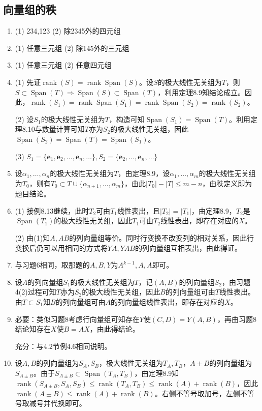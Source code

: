 \documentclass[a4paper,UTF8,fontset=windows]{ctexart}
\DeclareMathOperator{\rank}{rank}
\DeclareMathOperator{\Span}{Span}
\begin{document}
\subsection{向量组的秩}
\begin{enumerate}
\item
(1) 234,123 (2) 除2345外的四元组

\item
(1) 任意三元组 (2) 除145外的三元组

\item
(1) 任意三元组 (2) 任意四元组

\item
(1) 先证$\rank(S)=\rank\Span(S)$。设$S$的极大线性无关组为$T$，则$S\subset\Span(T)\Rightarrow\Span(S)\subset\Span(T)$，利用定理8.9知结论成立。因此，$\rank(S_1)=\rank\Span(S_1)=\rank\Span(S_2)=\rank(S_2)$。

(2) 设$S_1$的极大线性无关组为$T$，构造可知$\Span(S_1)=\Span(T)$。利用定理8.10与数量计算可知$T$亦为$S_2$的极大线性无关组，因此$\Span(S_2)=\Span(T)=\Span(S_1)$。

(3) $S_1=\{\mathbf{e}_1,\mathbf{e}_2,\dots,\mathbf{e}_n,\dots\},S_2=\{\mathbf{e}_2,\dots,\mathbf{e}_n,\dots\}$

\item
设$\alpha_1,\dots,\alpha_n$的极大线性无关组为$T$，由定理8.9，设$\alpha_1,\dots,\alpha_m$的极大线性无关组为$T_0$，则有$T_0\subset T\cup\{\alpha_{n+1},\dots,\alpha_m\}$，由此$|T_0|-|T|\le m-n$，由秩定义即为题目结论。

\item
(1) 接例8.13继续，此时$T_2$可由$T_1$线性表出，且$|T_2|=|T_1|$，由定理8.9，$T_2$是$\Span(T_1)$的极大线性无关组，因此$T_1$可由$T_2$线性表出，即存在对应的$X$。

(2) 由(1)知$A,AB$的列向量组等价。同时行变换不改变列的相对关系，因此行变换后仍可以用相同的方式将$YA,YAB$的列向量组互相表出，由此得证。

\item
与习题6相同，取那题的$A,B,Y$为$A^{k-1},A,A$即可。

\item
设$A$的列向量组$S_1$的极大线性无关组为$T$，记$(A,B)$的列向量组$S_2$，由习题4(2)过程可知$T$亦为$S_2$的极大线性无关组，因此$B$的列向量组可由$T$线性表出。由$T\subset S_1$知$B$的列向量组可由$A$的列向量组线性表出，即存在对应的$X$。

\item
必要：类似习题8考虑行向量组可知存在$Y$使$(C,D)=Y(A,B)$，再由习题8结论知存在$X$使$B=AX$，由此得结论。

充分：与4.2节例4.6相同说明。

\item
设$A,B$的列向量组为$S_A,S_B$，极大线性无关组为$T_A,T_B$，$A\pm B$的列向量组为$S_{A\pm B}$。由于$S_{A\pm B}\subset\Span(T_A,T_B)$，由定理8.9知$\rank(S_{A\pm B},S_A,S_B)\le\rank(T_A,T_B)\le\rank(A)+\rank(B)$，因此$\rank(A\pm B)\le\rank(A)+\rank(B)$。右侧不等号取加号，左侧不等号取减号并代换即可。
\end{enumerate}
\end{document}
